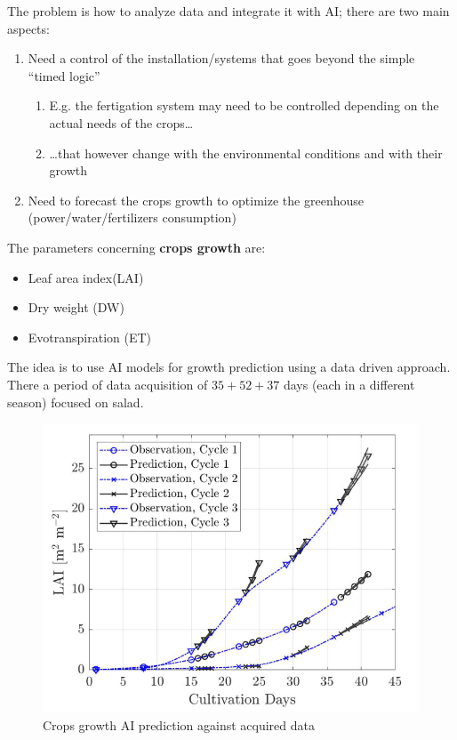 The problem is how to analyze data and integrate it with AI;
there are two main aspects:
\begin{enumerate}
   \item 
   Need a control of the installation/systems that goes beyond
   the simple “timed logic”
   \begin{enumerate}
      \item 
      E.g. the fertigation system may need to be controlled
      depending on the actual needs of the crops\dots
      \item \dots that however change with the environmental
      conditions and with their growth
   \end{enumerate}
   \item
   Need to forecast the crops growth to optimize the
   greenhouse (power/water/fertilizers consumption)
\end{enumerate}

The parameters concerning \textbf{crops growth} are:
\begin{itemize}
   \item Leaf area index(LAI)
   \item Dry weight (DW)
   \item Evotranspiration (ET)
\end{itemize}
The idea is to use AI models for growth prediction using a data driven approach.
There a period of data acquisition of $35+52+37$ days (each in a different season) focused on salad.

\begin{figure}[htbp]
   \centering
   \includegraphics{images/greenhouse_aiprediction.png}
   \caption{Crops growth AI prediction against acquired data}
   \label{fig:greenhouse_aiprediction}
\end{figure}


